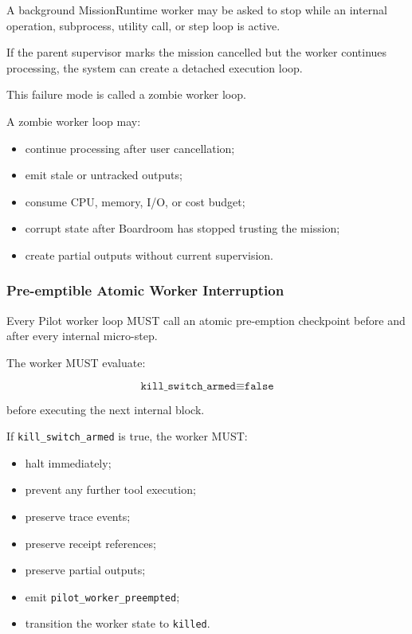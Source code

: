 A background MissionRuntime worker may be asked to stop while an internal operation, subprocess, utility call, or step loop is active.

If the parent supervisor marks the mission cancelled but the worker continues processing, the system can create a detached execution loop.

This failure mode is called a zombie worker loop.

A zombie worker loop may:

\begin{itemize}
  \item continue processing after user cancellation;
  \item emit stale or untracked outputs;
  \item consume CPU, memory, I/O, or cost budget;
  \item corrupt state after Boardroom has stopped trusting the mission;
  \item create partial outputs without current supervision.
\end{itemize}

\subsubsection{Pre-emptible Atomic Worker Interruption}

Every Pilot worker loop MUST call an atomic pre-emption checkpoint before and after every internal micro-step.

The worker MUST evaluate:

\begin{equation}
\texttt{kill\_switch\_armed} \equiv \texttt{false}
\end{equation}

before executing the next internal block.

If \texttt{kill\_switch\_armed} is true, the worker MUST:

\begin{itemize}
  \item halt immediately;
  \item prevent any further tool execution;
  \item preserve trace events;
  \item preserve receipt references;
  \item preserve partial outputs;
  \item emit \texttt{pilot\_worker\_preempted};
  \item transition the worker state to \texttt{killed}.
\end{itemize}

